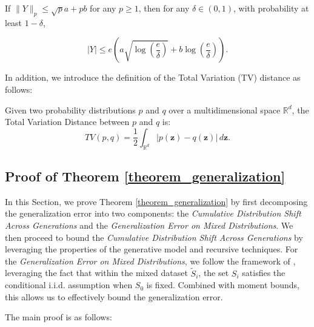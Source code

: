 \begin{lemma}\label{lemma_highprobability} If $\|Y\|_p \leq \sqrt{p} a+p b$ for any $p \geq 1$, then for any $\delta \in(0,1)$, with probability at least $1-\delta$,

$$
|Y| \leq e\left(a \sqrt{\log \left(\frac{e}{\delta}\right)}+b \log \left(\frac{e}{\delta}\right)\right).
$$

\end{lemma}

In addition, we introduce the definition of the Total Variation (TV) distance as follows:
\begin{definition} Given two probability distributions \( p \) and \( q \) over a multidimensional space \( \mathbb{R}^d \), the Total Variation Distance between \( p \) and \( q \) is:
\[ TV(p, q) = \frac{1}{2} \int_{\mathbb{R}^d} |p(\boldsymbol{z}) - q(\boldsymbol{z})| \, d\boldsymbol{z}. \]
\end{definition}














\subsection{Proof of Theorem \ref{theorem_generalization}}
In this Section, we prove Theorem \ref{theorem_generalization} by first decomposing the generalization error into two components: the \textit{Cumulative Distribution Shift Across Generations} and the \textit{Generalization Error on Mixed Distributions}. We then proceed to bound the \textit{Cumulative Distribution Shift Across Generations} by leveraging the properties of the generative model and recursive techniques. For the \textit{Generalization Error on Mixed Distributions}, we follow the framework of \cite{zheng2023toward}, leveraging the fact that within the mixed dataset $\widetilde{S}_i$, the set $S_i$ satisfies the conditional i.i.d. assumption when $S_0$ is fixed. Combined with moment bounds, this allows us to effectively bound the generalization error.


The main proof is as follows:

